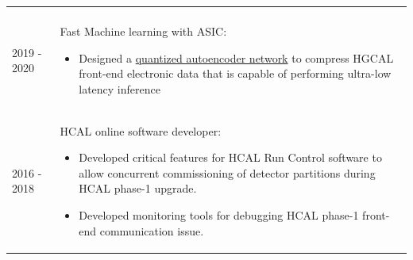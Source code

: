 \documentclass[letterpaper,11pt,oneside]{article}
\begin{document}
{\begin{tabular}{p{0.12\linewidth}  p{0.88\linewidth}}
\begin{itemize}[nosep]
            \end{itemize} \vspace*{-10pt}\\       
2019 - 2020 & Fast Machine learning with ASIC:
            \begin{itemize}[nosep]
            \item{Designed a \href{https://arxiv.org/abs/2105.01683}{quantized autoencoder network} to compress HGCAL front-end electronic data that is capable of performing ultra-low latency inference}
            \end{itemize} \vspace*{-15pt}\\              
2016 - 2018  & HCAL online software developer:
            \begin{itemize}[nosep]
              \item{Developed critical features for HCAL Run Control software to allow concurrent commissioning of detector partitions during HCAL phase-1 upgrade.}
              \item{Developed monitoring tools for debugging HCAL phase-1 front-end communication issue.} 
            \end{itemize}  \vspace*{-10pt} 

\end{tabular}
}
\end{document}
